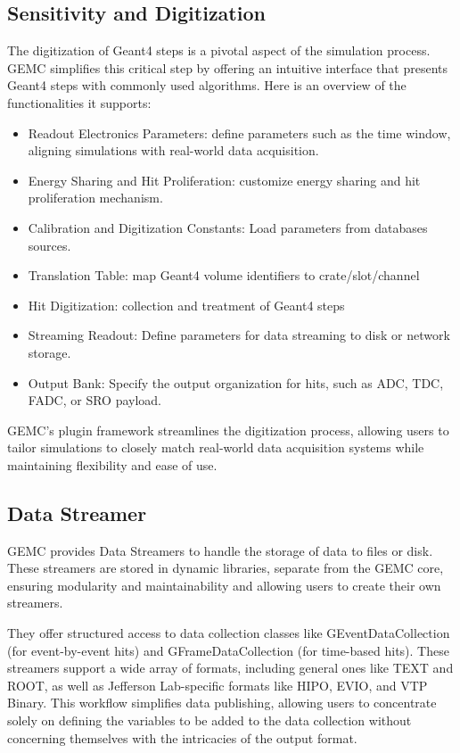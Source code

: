 \subsection{Sensitivity and Digitization}
\label{subsec:digitization}

The digitization of Geant4 steps is a pivotal aspect of the simulation process.
GEMC simplifies this critical step by offering an intuitive interface that presents Geant4 steps
with commonly used algorithms.
Here is an overview of the functionalities it supports:

\begin{itemize}
    \item Readout Electronics Parameters: define parameters such as the time window,
    aligning simulations with real-world data acquisition.
    \item Energy Sharing and Hit Proliferation: customize energy sharing and hit proliferation mechanism.
    \item Calibration and Digitization Constants: Load parameters from databases sources.
    \item Translation Table: map Geant4 volume identifiers to crate/slot/channel
    \item Hit Digitization: collection and treatment of Geant4 steps
    \item Streaming Readout: Define parameters for data streaming to disk or network storage.
    \item Output Bank: Specify the output organization for hits, such as ADC, TDC, FADC, or SRO payload.
\end{itemize}

GEMC's plugin framework streamlines the digitization process, allowing users to tailor simulations
to closely match real-world data acquisition systems while maintaining flexibility and ease of use.

\subsection{Data Streamer}
\label{subsec:data_streamer}

GEMC provides Data Streamers to handle the storage of data to files or disk.
These streamers are stored in dynamic libraries, separate from the GEMC core, ensuring modularity
and maintainability and allowing users to create their own streamers.

They offer structured access to data collection classes like GEventDataCollection (for event-by-event hits)
and GFrameDataCollection (for time-based hits).
These streamers support a wide array of formats, including general ones like TEXT and ROOT,
as well as Jefferson Lab-specific formats like HIPO, EVIO, and VTP Binary.
This workflow simplifies data publishing, allowing users to concentrate solely on defining the variables to be
added to the data collection without concerning themselves with the intricacies of the output format.


